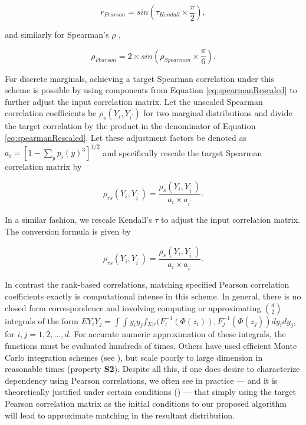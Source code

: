 \documentclass[
]{article}
\begin{document}
\begin{equation}
\label{eq:convertKendall}
r_{Pearson} = sin \left( \tau_{Kendall} \times \frac{\pi}{2} \right), 
\end{equation}

\noindent and similarly for Spearman's \(\rho\) \citep{K58},

\begin{equation}
\label{eq:convertSpearman}
\rho_{Pearson} = 2 \times sin \left( \rho_{Spearman} \times \frac{\pi}{6} \right).
\end{equation}

For discrete marginals, achieving a target Spearman correlation under this scheme is possible by using components from Equation \eqref{eq:spearmanRescaled} to further adjust the input correlation matrix. Let the unscaled Spearman correlation coefficients be \(\rho_{s} \left(Y_{i}, Y_{i^\prime}\right)\) for two marginal distributions and divide the target correlation by the product in the denominator of Equation \eqref{eq:spearmanRescaled}. Let these adjustment factors be denoted as \(a_i = \left[ 1 - \sum_y p_i(y)^3 \right]^{1/2}\) and specifically rescale the target Spearman correlation matrix by

\begin{equation}
\label{eq:convertSpearmanDiscrete}
\rho_{rs} \left(Y_{i}, Y_{i^\prime}\right) = \frac{\rho_{s} \left(Y_{i}, Y_{i^\prime}\right)}{a_i \times a_{i^\prime}}.
\end{equation}

In a similar fashion, we rescale Kendall's \(\tau\) to adjust the input correlation matrix. The conversion formula is given by

\begin{equation}
\label{eq:convertKendallDiscrete}
\rho_{rs} \left(Y_{i}, Y_{i^\prime}\right) = \frac{\rho_{s} \left(Y_{i}, Y_{i^\prime}\right)}{a_i \times a_{i^\prime}}.
\end{equation}

In contrast the rank-based correlations, matching specified Pearson correlation coefficients exactly is computational intense in this scheme. In general, there is no closed form correspondence and involving computing or approximating \(\binom{d}{2}\) integrals of the form \(EY_iY_j = \int \int y_i y_j f_{X|r}(F_i^{-1}(\Phi(z_i)), F_j^{-1}(\Phi(z_j))dy_idy_j\), for \(i,j=1,2,\ldots,d\). For accurate numeric approximation of these integrals, the functions must be evaluated hundreds of times. Others have used efficient Monte Carlo integration schemes (see \citet{Chen2001}), but scale poorly to large dimension in reasonable times (property \textbf{S2}). Despite all this, if one does desire to characterize dependency using Pearson correlations, we often see in practice --- and it is theoretically justified under certain conditions (\citet{Song00}) --- that simply using the target Pearson correlation matrix as the initial conditions to our proposed algorithm will lead to approximate matching in the resultant distribution.
\end{document}
